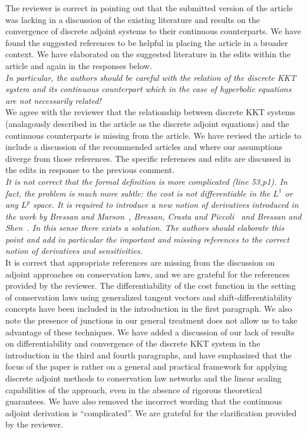 \documentclass[10pt]{article}
\begin{document}
The reviewer is correct in pointing out that the submitted version of the article was lacking in a discussion of the existing literature and results on the convergence of discrete adjoint systems to their continuous counterparts. We have found the suggested references to be helpful in placing the article in a broader context. We have elaborated on the suggested literature in the edits within the article and again in the responses below.\\

\emph{In particular,
the authors should be careful with the relation of the discrete KKT system and its continuous
counterpart which in the case of hyperbolic equations are not necessarily related!}\\

We agree with the reviewer that the relationship between discrete KKT systems (analagously described in the article as the discrete adjoint equations) and the continuous counterparts is missing from the article. We have revised the article to include a discussion of the recommended articles and where our assumptions diverge from those references. The specific references and edits are discussed in the edits in response to the previous comment.\\

\emph{It is not correct that the formal definition is more complicated (line 53,p1).
In fact, the problem is much more subtle: the cost is not differentiable in the $L^1$ or
any $L^p$ space. It is required to introduce a new notion of derivatives introduced
in the work by Bressan and Marson~\cite{bressan1995variational}, Bressan, Crasta and Piccoli~\cite{Bressan2000WellPosedness} and Bressan and Shen~\cite{Bressan2007Optimality}.
 In this sense there exists a solution. The authors
should elaborate this point and add in particular the important and missing references
to the correct notion of derivatives and sensitivities.}\\

It is correct that appropriate references are missing from the discussion on adjoint approaches on conservation laws, and we are grateful for the references provided by the reviewer. The differentiability of the cost function in the setting of conservation laws using generalized tangent vectors and shift-differentiability concepts have been included in the introduction in the first paragraph. We also note the presence of junctions in our general treatment does not allow us to take advantage of these techniques. We have added a discussion of our lack of results on differentiability and convergence of the discrete KKT system in the introduction in the third and fourth paragraphs, and have emphasized that the focus of the paper is rather on a general and practical framework for applying discrete adjoint methods to conservation law networks and the linear scaling capabilities of the approach, even in the absence of rigorous theoretical guarantees. We have also removed the incorrect wording that the continuous adjoint derivation is ``complicated''. We are grateful for the clarification provided by the reviewer.\\
\end{document}
